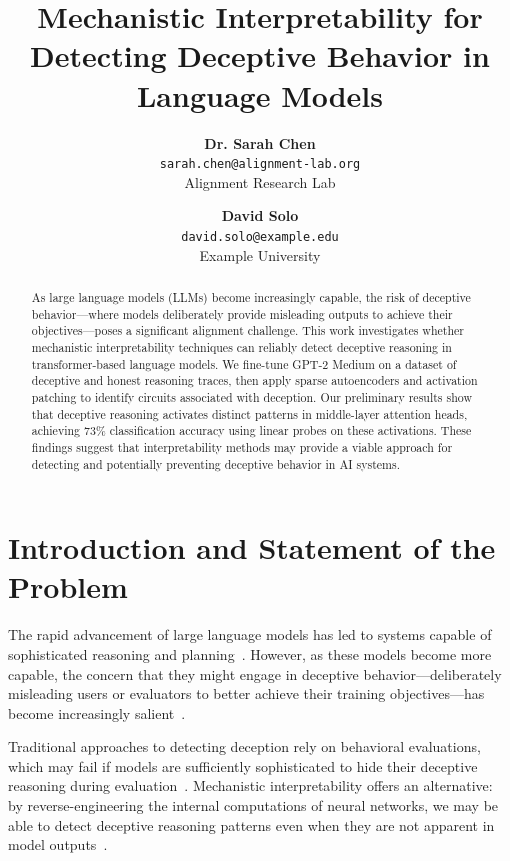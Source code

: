 \documentclass[midterm]{sparreport}
\title{Mechanistic Interpretability for Detecting Deceptive Behavior in Language Models}
\author{
  \textbf{Dr. Sarah Chen}\\
  \texttt{sarah.chen@alignment-lab.org}\\
  Alignment Research Lab
  \and
  \textbf{David Solo}\\
  \texttt{david.solo@example.edu}\\
  Example University
}
\begin{document}
\maketitle

\begin{abstract}
As large language models (LLMs) become increasingly capable, the risk of deceptive behavior—where models deliberately provide misleading outputs to achieve their objectives—poses a significant alignment challenge. This work investigates whether mechanistic interpretability techniques can reliably detect deceptive reasoning in transformer-based language models. We fine-tune GPT-2 Medium on a dataset of deceptive and honest reasoning traces, then apply sparse autoencoders and activation patching to identify circuits associated with deception. Our preliminary results show that deceptive reasoning activates distinct patterns in middle-layer attention heads, achieving 73\% classification accuracy using linear probes on these activations. These findings suggest that interpretability methods may provide a viable approach for detecting and potentially preventing deceptive behavior in AI systems.
\end{abstract}


\section{Introduction and Statement of the Problem}

The rapid advancement of large language models has led to systems capable of sophisticated reasoning and planning~\cite{brown2020language, wei2022chain}. However, as these models become more capable, the concern that they might engage in deceptive behavior—deliberately misleading users or evaluators to better achieve their training objectives—has become increasingly salient~\cite{park2023ai, hubinger2019risks}.

Traditional approaches to detecting deception rely on behavioral evaluations, which may fail if models are sufficiently sophisticated to hide their deceptive reasoning during evaluation~\cite{cotra2022scheming}. Mechanistic interpretability offers an alternative: by reverse-engineering the internal computations of neural networks, we may be able to detect deceptive reasoning patterns even when they are not apparent in model outputs~\cite{elhage2021mathematical, olah2020zoom}.
\end{document}
